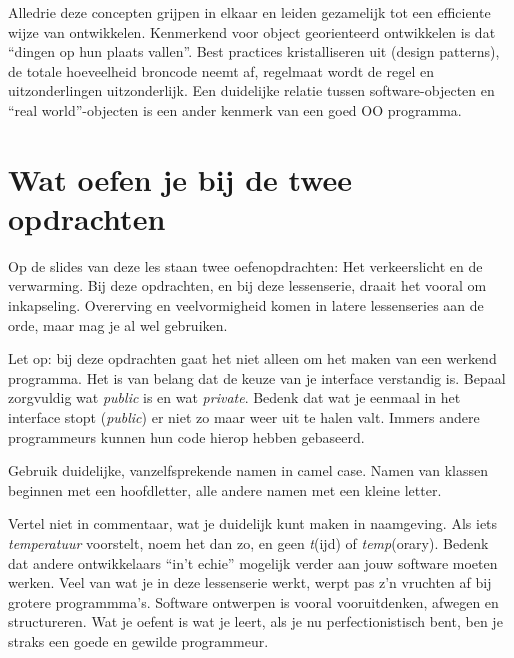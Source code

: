 \documentclass[a4paper,11pt]{article}
\begin{document}
Alledrie deze concepten grijpen in elkaar en leiden gezamelijk tot een efficiente wijze van ontwikkelen.
Kenmerkend voor object georienteerd ontwikkelen is dat ``dingen op hun plaats vallen''.
Best practices kristalliseren uit (design patterns), de totale hoeveelheid broncode neemt af, regelmaat wordt de regel en uitzonderlingen uitzonderlijk.
Een duidelijke relatie tussen software-objecten en ``real world''-objecten is een ander kenmerk van een goed OO programma.

\section{Wat oefen je bij de twee opdrachten}

Op de slides van deze les staan twee oefenopdrachten: Het verkeerslicht en de verwarming.
Bij deze opdrachten, en bij deze lessenserie, draait het vooral om inkapseling.
Overerving en veelvormigheid komen in latere lessenseries aan de orde, maar mag je al wel gebruiken.

Let op: bij deze opdrachten gaat het niet alleen om het maken van een werkend programma.
Het is van belang dat de keuze van je interface verstandig is.
Bepaal zorgvuldig wat \emph{public} is en wat \emph{private}.
Bedenk dat wat je eenmaal in het interface stopt (\emph{public}) er niet zo maar weer uit te halen valt.
Immers andere programmeurs kunnen hun code hierop hebben gebaseerd.

Gebruik duidelijke, vanzelfsprekende namen in camel case.
Namen van klassen beginnen met een hoofdletter, alle andere namen met een kleine letter.

Vertel niet in commentaar, wat je duidelijk kunt maken in naamgeving.
Als iets \emph{temperatuur} voorstelt, noem het dan zo, en geen \emph{t}(ijd) of \emph{temp}(orary).
Bedenk dat andere ontwikkelaars ``in't echie'' mogelijk verder aan jouw software moeten werken.
Veel van wat je in deze lessenserie werkt, werpt pas z'n vruchten af bij grotere programmma's.
Software ontwerpen is vooral vooruitdenken, afwegen en structureren.
Wat je oefent is wat je leert, als je nu perfectionistisch bent, ben je straks een goede en gewilde programmeur.
\end{document}
